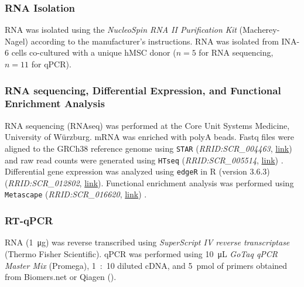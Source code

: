 \subsubsection*{RNA Isolation}
RNA was isolated using the \textit{NucleoSpin RNA II Purification Kit}
(Macherey-Nagel) according to the manufacturer's instructions. RNA was isolated
from INA-6 cells co-cultured with a unique hMSC donor ($n=5$ for RNA sequencing, $n=11$
for qPCR).

\subsubsection*{RNA sequencing, Differential Expression, and Functional Enrichment Analysis}
RNA sequencing (RNAseq) was performed at the Core Unit Systems Medicine,
University of Würzburg. mRNA was enriched with polyA beads. Fastq files were
aligned to the GRCh38 reference genome using \texttt{STAR}
(\textit{RRID:SCR\_004463},
\href{https://scicrunch.org/resolver/RRID:SCR_004463}{link}) and raw read
counts were generated using \texttt{HTseq} (\textit{RRID:SCR\_005514},
\href{https://scicrunch.org/resolver/SCR_005514}{link})
\cite{andersHTSeqPythonFramework2015,dobinSTARUltrafastUniversal2013,zerbinoEnsembl20182018}.
Differential gene expression was analyzed using \texttt{edgeR} in R (version
3.6.3) (\textit{RRID:SCR\_012802},
\href{https://scicrunch.org/resolver/SCR_012802}{link}). Functional
enrichment analysis was performed using \texttt{Metascape}
(\textit{RRID:SCR\_016620},
\href{https://scicrunch.org/resolver/SCR_016620}{link})
\cite{zhouMetascapeProvidesBiologistoriented2019}.


\subsubsection*{RT-qPCR}
RNA (\SI{1}{\micro\gram}) was reverse transcribed using \textit{SuperScript IV
    reverse transcriptase} (Thermo Fisher Scientific). qPCR was performed using
\SI{10}{\micro\liter} \textit{GoTaq qPCR Master Mix} (Promega), \SI{1}{:10}
diluted cDNA, and \SI{5}{pmol} of primers obtained from Biomers.net or Qiagen
().


